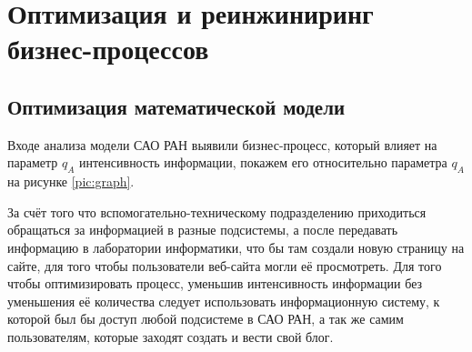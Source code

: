 \section{Оптимизация и реинжиниринг бизнес-процессов}
\subsection{Оптимизация математической модели}
Входе анализа модели САО РАН выявили бизнес-процесс, который влияет на параметр $q_A$ интенсивность информации, покажем его относительно параметра $q_A$ на рисунке \ref{pic:graph}.

За счёт того что вспомогательно-техническому подразделению приходиться обращаться за информацией в разные подсистемы, а после передавать информацию в лаборатории информатики, что бы там создали новую страницу на сайте, для того чтобы пользователи веб-сайта могли её просмотреть.   Для того чтобы оптимизировать процесс, уменьшив интенсивность информации без уменьшения её количества следует использовать информационную систему, к которой был бы доступ любой подсистеме в САО РАН, а так же самим пользователям, которые заходят создать и вести свой блог.
\pagebreak